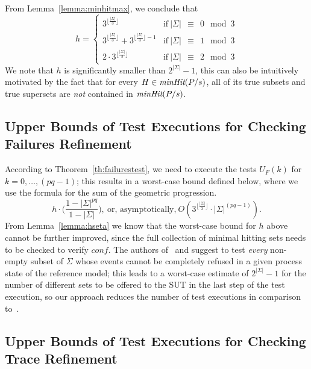 %
From Lemma~\ref{lemma:minhitmax}, we conclude that
$$h=\begin{cases}
3^{\lfloor\frac{|\Sigma|}{3}\rfloor} &\text{if}\  |\Sigma|~~\equiv~~0 \mod 3\\
3^{\lfloor\frac{|\Sigma|}{3}\rfloor}  + 3^{\lfloor\frac{|\Sigma|}{3}\rfloor-1}&\text{if}\ |\Sigma|~~\equiv~~1\mod 3\\
2\cdot 3^{\lfloor\frac{|\Sigma|}{3}\rfloor} &\text{if}\ |\Sigma|~~\equiv~~2 \mod 3
\end{cases}
$$
%
We note that $h$ is significantly smaller than $2^{|\Sigma|}-1$, this can
also be intuitively motivated by the fact that  for every $H\in
\text{\it minHit}(P/s)$, all of its true subsets and true supersets are {\it not}
contained in $\text{\it minHit}(P/s)$.

\subsection{Upper Bounds of Test Executions for Checking Failures Refinement}
According to  Theorem~\ref{th:failurestest}, we need to execute the tests $U_F(k)$ for
$k = 0,\dots,(pq-1)$; this results in a worst-case bound defined below, where
we use the formula for the sum of the geometric progression.
%
\[
h\cdot \big( \frac{1-|\Sigma|^{pq}}{1-|\Sigma|} \big),\
 \text{or, asymptotically,}\  O(3^{\lfloor\frac{|\Sigma|}{3}\rfloor}\cdot|\Sigma|^{(pq-1)}).
 \]
%
From Lemma~\ref{lemma:hseta} we know that the worst-case bound for $h$
above cannot be further improved, since the full collection of minimal
hitting sets needs to be checked to verify $conf$. The
authors of~\cite{Hennessy:1988:ATP:50497} and
\cite{DBLP:conf/icfem/CavalcantiG07} suggest to test {\it every} non-empty
subset of $\Sigma$ whose events cannot be completely refused in a given
process state of the reference model; this leads to a worst-case estimate of
$2^{|\Sigma|}-1$ for the number of different sets to be offered to the SUT in
the last step of the test execution, so our approach reduces the number of
test executions in comparison
to~\cite{Hennessy:1988:ATP:50497,DBLP:conf/icfem/CavalcantiG07}.


\subsection{Upper Bounds of Test Executions for Checking Trace Refinement}

